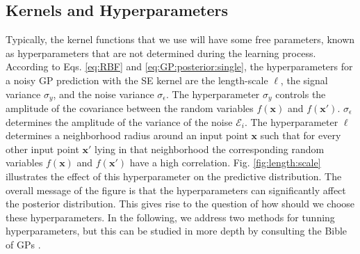 \documentclass[10pt]{article}
\theoremstyle{definition}
\begin{document}
\subsection{Kernels and Hyperparameters}
Typically, the kernel functions that we use will have some free parameters, known as hyperparameters that are not determined during the learning process. According to Eqs. \eqref{eq:RBF} and \eqref{eq:GP:posterior:single}, the hyperparameters for a noisy GP prediction with the SE kernel are the length-scale $\ell$, the signal variance $\sigma_y$, and the noise variance $\sigma_{\epsilon}$.  The hyperparameter $\sigma_y$ controls the amplitude of the covariance between the random variables $f(\mathbf{x})$ and $f(\mathbf{x}')$. $\sigma_{\epsilon}$ determines the amplitude of the variance of the noise $\mathcal{E}_i$. The hyperparameter $\ell$ determines a neighborhood radius around an input point $\mathbf{x}$ such that for every other input point $\mathbf{x}'$ lying in that neighborhood the corresponding random variables $f(\mathbf{x})$ and $f(\mathbf{x}')$ have a high correlation. Fig. \ref{fig:length:scale} illustrates the effect of this hyperparameter on the predictive distribution. The overall message of the figure is that the hyperparameters can significantly affect the posterior distribution. This gives rise to the question of how should we choose these hyperparameters. In the following, we address two methods for tunning hyperparameters, but this can be studied in more depth by consulting the Bible of GPs \cite[Chapter 5]{Rasmussen2006}.
\end{document}
